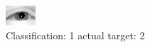 \begin{figure}[h!]
\begin{center}
\includegraphics[width=0.60\columnwidth]{figures/ID2276_class_1_target_2.png}
\end{center}
\caption{ Classification: 1 actual target: 2}
\label{fig:ID2276_class_1_target_2}
\end{figure}
